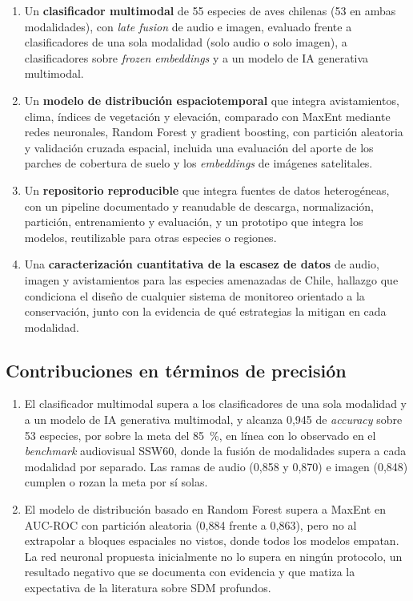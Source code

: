 \begin{enumerate}[leftmargin=*, itemsep=2pt]
  \item Un \textbf{clasificador multimodal} de 55 especies de aves chilenas
        (53 en ambas modalidades), con \textit{late fusion} de audio e imagen,
        evaluado frente a clasificadores de una sola modalidad (solo audio o
        solo imagen), a clasificadores sobre \textit{frozen embeddings} y a un
        modelo de IA generativa multimodal.
  \item Un \textbf{modelo de distribución espaciotemporal} que integra
        avistamientos, clima, índices de vegetación y elevación, comparado con
        MaxEnt mediante redes neuronales, Random Forest y gradient boosting,
        con partición aleatoria y validación cruzada espacial, incluida una
        evaluación del aporte de los parches de cobertura de suelo y los
        \textit{embeddings} de imágenes satelitales.
  \item Un \textbf{repositorio reproducible} que integra fuentes de datos
        heterogéneas, con un pipeline documentado y reanudable de descarga,
        normalización, partición, entrenamiento y evaluación, y un prototipo
        que integra los modelos, reutilizable para otras especies o regiones.
  \item Una \textbf{caracterización cuantitativa de la escasez de datos} de
        audio, imagen y avistamientos para las especies amenazadas de Chile,
        hallazgo que condiciona el diseño de cualquier sistema de monitoreo
        orientado a la conservación, junto con la evidencia de qué
        estrategias la mitigan en cada modalidad.
\end{enumerate}

\subsection{Contribuciones en términos de precisión}

\begin{enumerate}[leftmargin=*, itemsep=2pt]
  \item El clasificador multimodal supera a los clasificadores de una sola
        modalidad y a un modelo de IA generativa multimodal, y alcanza 0,945
        de \textit{accuracy} sobre 53 especies, por sobre la meta
        del \SI{85}{\percent}, en línea con lo observado en el
        \textit{benchmark} audiovisual SSW60, donde la fusión de modalidades
        supera a cada modalidad por separado. Las ramas de audio (0,858 y
        0,870) e imagen (0,848) cumplen o rozan la meta por sí solas.
  \item El modelo de distribución basado en Random Forest supera a
        MaxEnt en AUC-ROC con partición aleatoria (0,884 frente a 0,863), pero
        no al extrapolar a bloques espaciales no vistos, donde todos los
        modelos empatan. La red neuronal propuesta inicialmente no lo supera
        en ningún protocolo, un resultado negativo que se documenta con
        evidencia y que matiza la expectativa de la literatura sobre SDM
        profundos.
\end{enumerate}

